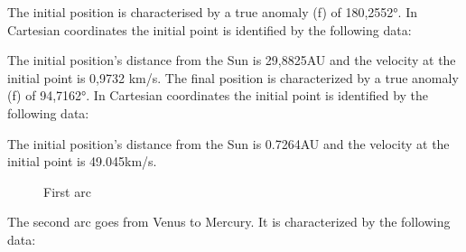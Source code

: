 \documentclass[11pt,a4paper]{report}
\begin{document}
The initial position is characterised by a true anomaly (f) of 180,2552°. In Cartesian coordinates the initial point is identified by the following data:

\begin{table}[H]
\centering
{}
\end{table}

The initial position’s distance from the Sun is 29,8825AU and the velocity at the initial point is 0,9732 km/s.
The final position is characterized by a true anomaly (f) of 94,7162°. In Cartesian coordinates the initial point is identified by the following data:

\begin{table}[H]
\centering
{}
\end{table}

The initial position’s distance from the Sun is 0.7264AU and the velocity at the initial point is 49.045km/s.

\begin{figure}[H]
\centering
{}
    \caption{First arc}
\end{figure}

The second arc goes from Venus to Mercury. It is characterized by the following data:

\begin{table}[H]
\centering
{}
\end{table}
\end{document}
